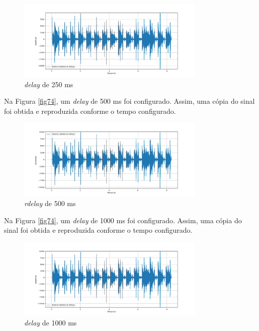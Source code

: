 \begin{figure}[h]
	\centering
    \includegraphics[width=0.8\textwidth]{figuras/fig75.png}
	\caption{\textit{delay} de 250 ms}
	\label{fig75}
\end{figure}

Na Figura \ref{fig74}, um \textit{delay} de 500 ms foi configurado. Assim, uma cópia do sinal foi obtida e reproduzida conforme o tempo configurado.

\begin{figure}[h]
	\centering
    \includegraphics[width=0.8\textwidth]{figuras/fig76.png}
	\caption{\textit{rdelay} de 500 ms}
	\label{fig76}
\end{figure}

Na Figura \ref{fig74}, um \textit{delay} de 1000 ms foi configurado. Assim, uma cópia do sinal foi obtida e reproduzida conforme o tempo configurado.

\begin{figure}[h]
	\centering
    \includegraphics[width=0.8\textwidth]{figuras/fig77.png}
	\caption{\textit{delay} de 1000 ms}
	\label{fig77}
\end{figure}
